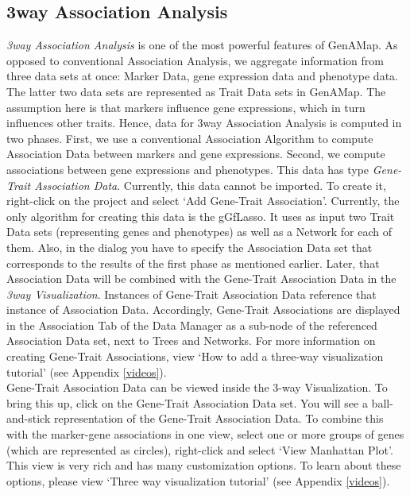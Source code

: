 \documentclass{article}
\begin{document}
\subsection{3way Association Analysis}

{\it 3way Association Analysis} is one of the most powerful features of GenAMap. As opposed to conventional Association Analysis, we aggregate information from three data sets at once: Marker Data, gene expression data and phenotype data. The latter two data sets are represented as Trait Data sets in GenAMap. The assumption here is that markers influence gene expressions, which in turn influences other traits. Hence, data for 3way Association Analysis is computed in two phases. First, we use a conventional Association Algorithm to compute Association Data between markers and gene expressions. Second, we compute associations between gene expressions and phenotypes. This data has type {\it Gene-Trait Association Data}. Currently, this data cannot be imported. To create it, right-click on the project and select `Add Gene-Trait Association'. Currently, the only algorithm for creating this data is the gGfLasso. It uses as input two Trait Data sets (representing genes and phenotypes) as well as a Network for each of them. Also, in the dialog you have to specify the Association Data set that corresponds to the results of the first phase as mentioned earlier. Later, that Association Data will be combined with the Gene-Trait Association Data in the {\it 3way Visualization}. Instances of Gene-Trait Association Data reference that instance of Association Data. Accordingly, Gene-Trait Associations are displayed in the Association Tab of the Data Manager as a sub-node of the referenced Association Data set, next to Trees and Networks. For more information on creating Gene-Trait Associations, view `How to add a three-way visualization tutorial' (see Appendix \ref{videos}).\\

Gene-Trait Association Data can be viewed inside the 3-way Visualization. To bring this up, click on the Gene-Trait Association Data set. You will see a ball-and-stick representation of the Gene-Trait Association Data. To combine this with the marker-gene associations in one view, select one or more groups of genes (which are represented as circles), right-click and select `View Manhattan Plot'. This view is very rich and has many customization options. To learn about these options, please view `Three way visualization tutorial' (see Appendix \ref{videos}).
\end{document}
